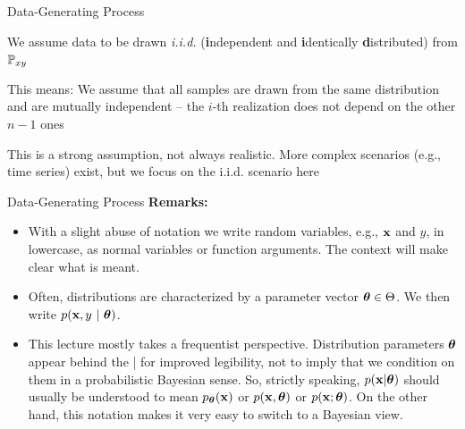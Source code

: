 \documentclass[11pt,compress,t,notes=noshow, xcolor=table]{beamer}
\begin{document}
\begin{framei}{Data-Generating Process}
\item We assume data to be drawn \emph{i.i.d.} (\textbf{i}ndependent and \textbf{i}dentically \textbf{d}istributed) from $\mathbb{P}_{xy}$
\item This means: We assume that all samples are drawn from the same distribution and are mutually independent -- the $i$-th realization does not depend on the other $n-1$ ones
\item This is a strong assumption, not always realistic.
More complex scenarios (e.g., time series) exist, but we focus on the i.i.d. scenario here
\vfill
{}
\end{framei}


\begin{framev}{Data-Generating Process}
\textbf{Remarks:}
\begin{itemize}
\item With a slight abuse of notation we write random variables, e.g., $\mathbf{x}$ and $y$, in lowercase, as normal variables or function arguments. 
The context will make clear what is meant.
\item Often, distributions are characterized by a parameter vector $\bm{\theta} \in \Theta$. We then write $p(\mathbf{x}, y ~|~ \bm{\theta})$.
\item This lecture mostly takes a frequentist perspective. Distribution parameters $\bm{\theta}$ appear behind the | for improved legibility, not to imply that we condition on them in a probabilistic Bayesian sense.
So, strictly speaking, $p(\mathbf{x} | \bm{\theta})$ should usually be understood to mean $p_{\bm{\theta}}(\mathbf{x})$ or $p(\mathbf{x}, \bm{\theta})$ or $p(\mathbf{x}; \bm{\theta})$.
On the other hand, this notation makes it very easy to switch to a Bayesian view.
\end{itemize}
\end{framev}

\endlecture
\end{document}
